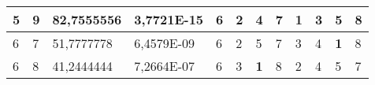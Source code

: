 \documentclass[conference]{IEEEtran}
\begin{document}
\begin{table*}[]
\begin{tabular}{|llll|llllllll|}
\multicolumn{1}{|l|}{5}                                                     & \multicolumn{1}{l|}{9}                                                        & \multicolumn{1}{l|}{82,7555556}                                                   & 3,7721E-15                     & \multicolumn{1}{l|}{6}                                                  & \multicolumn{1}{l|}{2}                                                  & \multicolumn{1}{l|}{4}                                                  & \multicolumn{1}{l|}{7}                                                  & \multicolumn{1}{l|}{\textbf{1}}                                         & \multicolumn{1}{l|}{3}                                                  & \multicolumn{1}{l|}{5}                                                  & 8                          \\ \hline
\multicolumn{1}{|l|}{6}                                                     & \multicolumn{1}{l|}{7}                                                        & \multicolumn{1}{l|}{51,7777778}                                                   & 6,4579E-09                     & \multicolumn{1}{l|}{6}                                                  & \multicolumn{1}{l|}{2}                                                  & \multicolumn{1}{l|}{5}                                                  & \multicolumn{1}{l|}{7}                                                  & \multicolumn{1}{l|}{3}                                                  & \multicolumn{1}{l|}{4}                                                  & \multicolumn{1}{l|}{\textbf{1}}                                         & 8                          \\ \hline
\multicolumn{1}{|l|}{6}                                                     & \multicolumn{1}{l|}{8}                                                        & \multicolumn{1}{l|}{41,2444444}                                                   & 7,2664E-07                     & \multicolumn{1}{l|}{6}                                                  & \multicolumn{1}{l|}{3}                                                  & \multicolumn{1}{l|}{\textbf{1}}                                         & \multicolumn{1}{l|}{8}                                                  & \multicolumn{1}{l|}{2}                                                  & \multicolumn{1}{l|}{4}                                                  & \multicolumn{1}{l|}{5}                                                  & 7                          \\ \hline

\end{tabular}
\end{table*}
\end{document}
